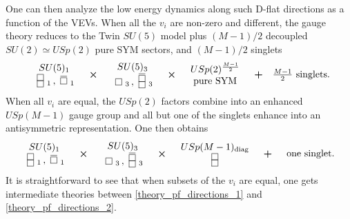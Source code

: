 \documentclass[a4paper,12pt]{article}
\newcommand{\drawsquare}[2]{\hbox{%
\rule{#2pt}{#1pt}\hskip-#2pt%
\rule{#1pt}{#2pt}\hskip-#1pt%
\rule[#1pt]{#1pt}{#2pt}}\rule[#1pt]{#2pt}{#2pt}\hskip-#2pt%
\rule{#2pt}{#1pt}}%
\newcommand{\fund}{~\raisebox{-.5pt}{\drawsquare{6.5}{0.4}}~}
\newcommand{\antifund}{~\overline{\raisebox{-.5pt}{\drawsquare{6.5}{0.4}}}~}
\newcommand{\asymm}{~\raisebox{-3.5pt}{\drawsquare{6.5}{0.4}}\hskip-6.9pt%
        \raisebox{3pt}{\drawsquare{6.5}{0.4}}~}%
\newcommand{\antiasymm}{~\overline{\raisebox{-3.5pt}{\drawsquare{6.5}{0.4}}\hskip-6.9pt%
        \raisebox{3pt}{\drawsquare{6.5}{0.4}}}~}%
\begin{document}
One can then analyze the low energy dynamics along such D-flat directions as a function of the VEVs. When all the $v_i$ are non-zero and different, the gauge theory reduces to the Twin $SU(5)$ model plus $(M-1)/2$ decoupled $SU(2)\simeq USp(2)$ pure SYM sectors, and $(M-1)/2$ singlets 
\begin{equation}
\begin{array}{ccccccc}
	\begin{array}{c}
	SU(5)_1  \\
	\asymm_1 \, , \quad \antifund_1 
	\end{array} & \boldsymbol{\times} & \begin{array}{c} SU(5)_3 \\
  \fund_3\, , \quad \antiasymm_3
\end{array} & \boldsymbol{\times} &  \begin{array}{c}
	USp(2)^{\frac{M-1}{2}} \\
	\text{pure SYM} 
\end{array} & \boldsymbol{+} & \frac{M-1}{2} \text{ singlets.}
\end{array}
\label{theory_pf_directions_1}
\end{equation}
When all $v_i$ are equal, the $USp(2)$ factors combine into an enhanced $USp(M-1)$ gauge group and all but one of the singlets enhance into an antisymmetric representation. One then obtains 
\begin{equation}
	\begin{array}{ccccccc}
		\begin{array}{c}
		SU(5)_1  \\
		\asymm_1 \, , \quad \antifund_1 
	\end{array} & \boldsymbol{\times} & \begin{array}{c} SU(5)_3 \\
		\fund_3\, , \quad \antiasymm_3
	\end{array} & \boldsymbol{\times} &  \begin{array}{c}
			USp(M-1)_\text{diag} \\
		 \asymm
	\end{array} & \boldsymbol{+} &  \begin{array}{c}
	\text{one singlet.}
	\end{array} 
	\end{array}
	\label{theory_pf_directions_2}
\end{equation}
It is straightforward to see that when subsets of the $v_i$ are equal, one gets intermediate theories between \eqref{theory_pf_directions_1} and \eqref{theory_pf_directions_2}.
\end{document}
